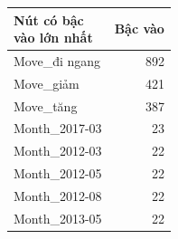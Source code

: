 \begin{tabular}{lr}
\toprule
\makecell[l]{Nút có bậc\\vào lớn nhất} & Bậc vào \\
\midrule
Move\_đi ngang & 892 \\
Move\_giảm & 421 \\
Move\_tăng & 387 \\
Month\_2017-03 & 23 \\
Month\_2012-03 & 22 \\
Month\_2012-05 & 22 \\
Month\_2012-08 & 22 \\
Month\_2013-05 & 22 \\
\bottomrule
\end{tabular}
